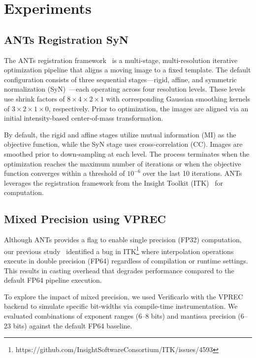 \documentclass[journal,twoside,web]{ieeecolor}
\begin{document}
\section{Experiments}
\label{sec:experiments}
\subsection{ANTs Registration SyN}
The ANTs registration framework~\cite{Avants2020-xx} is a multi-stage, multi-resolution iterative optimization pipeline that aligns a moving image to a fixed template. The default configuration consists of three sequential stages---rigid, affine, and symmetric normalization (SyN)~\cite{Avants2008-ea}---each operating across four resolution levels. These levels use shrink factors of $8\times4\times2\times1$ with corresponding Gaussian smoothing kernels of $3\times2\times1\times0$, respectively. Prior to optimization, the images are aligned via an initial intensity-based center-of-mass transformation.

By default, the rigid and affine stages utilize mutual information (MI) as the objective function, while the SyN stage uses cross-correlation (CC). Images are smoothed prior to down-sampling at each level. The process terminates when the optimization reaches the maximum number of iterations or when the objective function converges within a threshold of $10^{-6}$ over the last 10 iterations. ANTs leverages the registration framework from the Insight Toolkit (ITK)~\cite{Yoo2002-ve, McCormick2014-ok} for computation.

\subsection{Mixed Precision using VPREC}
Although ANTs provides a flag to enable single precision (FP32) computation, our previous study~\cite{Dugre2025-fs} identified a bug in ITK\footnote{https://github.com/InsightSoftwareConsortium/ITK/issues/4593} where interpolation operations execute in double precision (FP64) regardless of compilation or runtime settings. This results in casting overhead that degrades performance compared to the default FP64 pipeline execution.

To explore the impact of mixed precision, we used Verificarlo with the VPREC backend to simulate specific bit-widths via compile-time instrumentation. We evaluated combinations of exponent ranges (6--8 bits) and mantissa precision (6--23 bits) against the default FP64 baseline.
\end{document}
